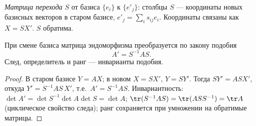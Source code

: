 \begin{definition}
\emph{Матрица перехода} $S$ от базиса $\{e_i\}$ к $\{e'_j\}$: столбцы $S$ — координаты новых
базисных векторов в старом базисе, $e'_j=\sum_i s_{ij}e_i$. Координаты связаны как $X=SX'$. $S$
обратима.
\end{definition}

\begin{theorem}
При смене базиса матрица эндоморфизма преобразуется по закону подобия
\[
  A'=S^{-1}AS .
\]
След, определитель и ранг — инварианты подобия.
\end{theorem}

\begin{proof}
В старом базисе $Y=AX$; в новом $X=SX'$, $Y=SY'$. Тогда $SY'=ASX'$, откуда
$Y'=S^{-1}AS\,X'$, т.е.\ $A'=S^{-1}AS$. Инвариантность:
$\det A'=\det S^{-1}\det A\det S=\det A$; $\tr(S^{-1}AS)=\tr(ASS^{-1})=\tr A$ (циклическое свойство
следа); ранг сохраняется при умножении на обратимые матрицы.
\end{proof}
